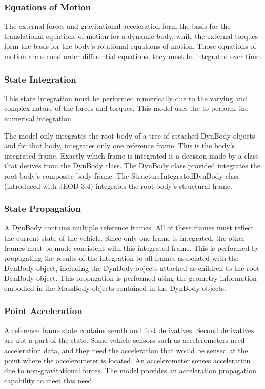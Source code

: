 \subsubsection{Equations of Motion}\label{sec:key_eom}
The external forces and gravitational acceleration form the basis for the
translational equations of motion for a dynamic body, while the external torques
form the basis for the body's rotational equations of motion. Those equations
of motion are second order differential equations; they must be integrated over
time.

\subsubsection{State Integration}\label{sec:key_state_integ}
This state integration must be performed numerically due to the varying and complex nature of the forces and torques. This model uses the \INTEGRATION to
perform the numerical integration.

The model only integrates the root body of a tree of attached DynBody objects
and for that body, integrates only one reference frame. This is the body's
integrated frame. Exactly which frame is integrated is a decision made by a
class that derives from the DynBody class. The DynBody class provided integrates the root body's composite body frame.
The StructureIntegratedDynBody class (introduced with JEOD 3.4) integrates the
root body's structural frame.

\subsubsection{State Propagation}\label{sec:key_state_prop}
A DynBody contains multiple reference frames. All of these frames must reflect
the current state of the vehicle. Since only one frame is integrated, the other
frames must be made consistent with this integrated frame. This is performed
by propagating the results of the integration to all frames associated
with the DynBody object, including the DynBody objects attached as children
to the root DynBody object. This propagation is performed using the geometry
information embodied in the MassBody objects contained in the DynBody objects.

\subsubsection{Point Acceleration}
A reference frame state contains zeroth and first derivatives. Second
derivatives are not a part of the state. Some vehicle sensors such as
accelerometers need acceleration data, and they need the acceleration that
would be sensed at the point where the accelerometer is located.
An accelerometer senses acceleration due to non-gravitational forces.
The model provides an acceleration propagation capability to meet this
need.

